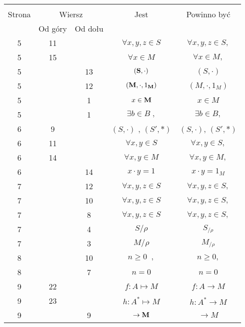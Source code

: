 \documentclass[a4paper,11pt]{article}
\begin{document}
\begin{center}

  \begin{tabular}{|c|c|c|c|c|}
    \hline
    & \multicolumn{2}{c|}{} & & \\
    Strona & \multicolumn{2}{c|}{Wiersz} & Jest
                              & Powinno być \\ \cline{2-3}
    & Od góry & Od dołu & & \\
    \hline
    5  & 11 & & $\forall x, y, z \in S$ & $\forall x, y, z \in S,$ \\
    5  & 15 & & $\forall x \in M$ & $\forall x \in M,$ \\
    5  & & 13 & $( \textrm{\textbf{S}}, \cdot )$ & $( S, \cdot )$ \\
    5  & & 12 & $( \textrm{\textbf{M}}, \cdot, 1_{ \textrm{\textbf{M}}} )$
           & $( M, \cdot, 1_{ M } )$ \\
    5  & &  1 & $x \in \textrm{\textbf{M}}$ & $x \in M$ \\
    5  & &  1 & $\exists b \in B\; ,$ & $\exists b \in B,$ \\
    6  &  9 & & $( S, \cdot )${ }, { }{ }$( S', \ast )$
           & $( S, \cdot )$, $( S', \ast )$ \\
    6  & 11 & & $\forall x, y \in S$ & $\forall x, y \in S,$ \\
    6  & 14 & & $\forall x, y \in M$ & $\forall x, y \in M,$ \\
    6  & & 14 & $x \cdot y = 1$ & $x \cdot y = 1_{ M }$ \\
    7  & & 12 & $\forall x, y, z \in S$ & $\forall x, y, z \in S,$ \\
    7  & & 10 & $\forall x, y, z \in S$ & $\forall x, y, z \in S,$ \\
    7  & &  8 & $\forall x, y, z \in S$ & $\forall x, y, z \in S,$ \\
    7  & &  4 & $S / \rho$ & $S_{ / \rho }$ \\
    7  & &  3 & $M / \rho$ & $M_{ / \rho }$ \\
    8  & & 10 & $n \geq 0\;\;,$ & $n \geq 0,$ \\
    8  & &  7 & $n \!\! = \!\! 0$ & $n = 0$ \\
    9  & 22 & & $f : A \mapsto M$ & $f : A \to M$ \\
    9  & 23 & & $h : A^{ * } \mapsto M$ & $h : A^{ * } \to M$ \\
    9  & &  9 & $\to \textrm{\textbf{M}}$ & $\to M$ \\
    \hline
  \end{tabular}

\end{center}
\end{document}
